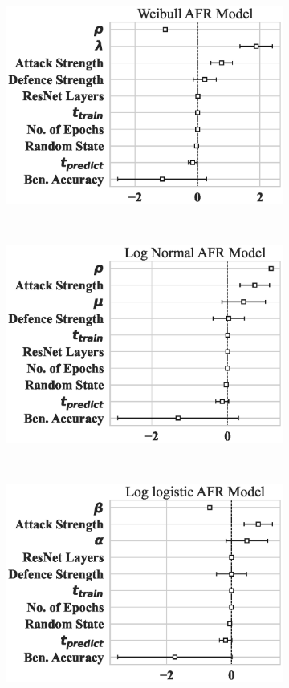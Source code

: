 \begin{figure}
	\begin{subfigure}{0.32\textwidth}
		\centering
		\includegraphics[width=\textwidth]{cifar100/weibull_aft.eps}
	\end{subfigure}%
	~
	\begin{subfigure}{0.32\textwidth}
		\centering
		\includegraphics[width=\textwidth]{cifar100/log_normal_aft.eps}
	\end{subfigure}
	~
	\begin{subfigure}{0.32\textwidth}
		\centering
		\includegraphics[width=\textwidth]{cifar100/log_logistic_aft.eps}

\end{subfigure}
\end{figure}
